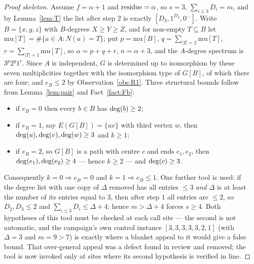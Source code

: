 \begin{proof}[Proof skeleton]
Assume $f = \alpha+1$ and $\operatorname{residue} = \alpha$, so $s = 3$, $\sum_{i \le 3} D_i = m$, and by
Lemma~\ref{lem:T} the list after step $2$ is exactly $[D_3, 1^{D_3}, 0^{\dots}]$. Write
$B = \{x,y,z\}$ with $B$-degrees $X \ge Y \ge Z$, and for non-empty $T \subseteq B$ let
$\mathrm{mu}[T] = \#\{a \in A : N(a) = T\}$; put $p = \mathrm{mu}[B]$,
$q = \sum_{|T| = 2}\mathrm{mu}[T]$, $r = \sum_{|T|=1}\mathrm{mu}[T]$, so
$\alpha = p+q+r$, $n = \alpha+3$, and the $A$-degree spectrum is $3^p 2^q 1^r$. Since $A$
is independent, $G$ is determined up to isomorphism by these seven multiplicities together
with the isomorphism type of $G[B]$, of which there are four; and $e_B \le 2$ by
Observation~\ref{obs:R1}. Three structural bounds follow from Lemma~\ref{lem:pair} and
Fact~\ref{fact:Fb}:
\begin{itemize}
\item if $e_B = 0$ then every $b \in B$ has $\mathrm{deg}(b) \ge 2$;
\item if $e_B = 1$, say $E(G[B]) = \{uv\}$ with third vertex $w$, then
$\mathrm{deg}(u),\mathrm{deg}(v),\mathrm{deg}(w) \ge 3$ and $k \ge 1$;
\item if $e_B = 2$, so $G[B]$ is a path with centre $c$ and ends $e_1,e_2$, then
$\mathrm{deg}(e_1),\mathrm{deg}(e_2) \ge 4$ --- hence $k \ge 2$ --- and $\mathrm{deg}(c) \ge 3$.
\end{itemize}
Consequently $k = 0 \Rightarrow e_B = 0$ and $k = 1 \Rightarrow e_B \le 1$. One further
tool is used: if the degree list with one copy of $\Delta$ removed has all entries $\le 3$
\emph{and} $\Delta$ is at least the number of its entries equal to $3$, then after step $1$
all entries are $\le 2$, so $D_2, D_3 \le 2$ and $\sum_{i \le 3} D_i \le \Delta + 4$; hence
$m > \Delta + 4$ forces $s \ge 4$. Both hypotheses of this tool must be checked at each
call site --- the second is not automatic, and the campaign's own control instance
$[3,3,3,3,3,2,1]$ (with $\Delta = 3$ and $m = 9 > 7$) is exactly where a blanket appeal to
it would give a false bound. That over-general appeal was a defect found in review and
removed; the tool is now invoked only at sites where its second hypothesis is verified in
line.


\end{proof}
